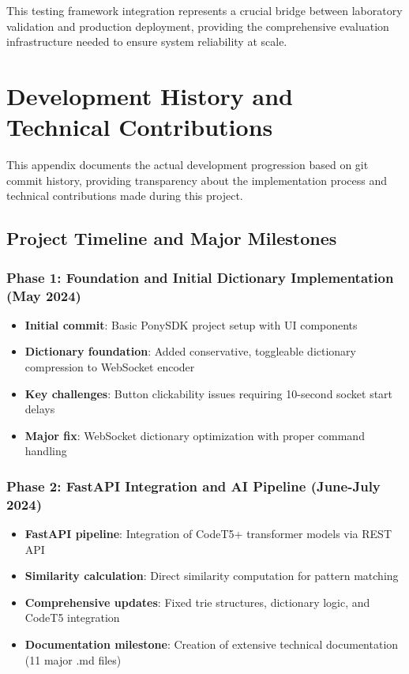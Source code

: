 \documentclass[12pt,a4paper]{article}
\begin{document}
This testing framework integration represents a crucial bridge between laboratory validation and production deployment, providing the comprehensive evaluation infrastructure needed to ensure system reliability at scale.

\section{Development History and Technical Contributions}
\label{annex:development-history}

This appendix documents the actual development progression based on git commit history, providing transparency about the implementation process and technical contributions made during this project.

\subsection{Project Timeline and Major Milestones}

\subsubsection{Phase 1: Foundation and Initial Dictionary Implementation (May 2024)}
\begin{itemize}
    \item \textbf{Initial commit}: Basic PonySDK project setup with UI components
    \item \textbf{Dictionary foundation}: Added conservative, toggleable dictionary compression to WebSocket encoder
    \item \textbf{Key challenges}: Button clickability issues requiring 10-second socket start delays
    \item \textbf{Major fix}: WebSocket dictionary optimization with proper command handling
\end{itemize}

\subsubsection{Phase 2: FastAPI Integration and AI Pipeline (June-July 2024)}
\begin{itemize}
    \item \textbf{FastAPI pipeline}: Integration of CodeT5+ transformer models via REST API
    \item \textbf{Similarity calculation}: Direct similarity computation for pattern matching
    \item \textbf{Comprehensive updates}: Fixed trie structures, dictionary logic, and CodeT5 integration
    \item \textbf{Documentation milestone}: Creation of extensive technical documentation (11 major .md files)
\end{itemize}
\end{document}
